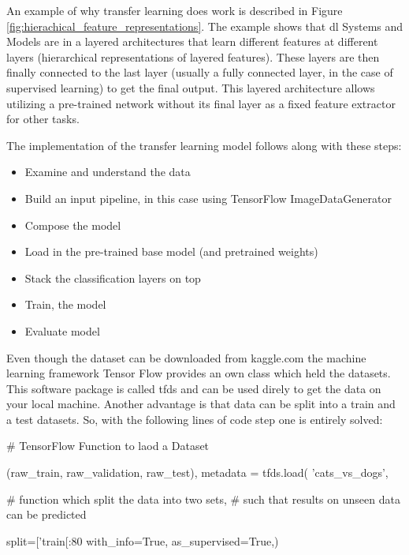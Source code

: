 An example of why transfer learning does work is described in  Figure \ref{fig:hierachical_feature_representations}. The example shows that \gls{dl} Systems and Models are in a layered architectures that learn different features at different layers (hierarchical representations of layered features). These layers are then finally connected to the last layer (usually a fully connected layer, in the case of supervised learning) to get the final output. This layered architecture allows utilizing a pre-trained network without its final layer as a fixed feature extractor for other tasks.

The implementation of the transfer learning model follows along with these steps:
\begin{itemize}
	\item Examine and understand the data
	\item Build an input pipeline, in this case using TensorFlow ImageDataGenerator
	\item Compose the model
	\item Load in the pre-trained base model (and pretrained weights)
	\item Stack the classification layers on top
	\item Train, the model
	\item Evaluate model
\end{itemize}

Even though the dataset can be downloaded from kaggle.com the machine learning framework Tensor Flow provides an own class which held the datasets. This software package is called tfds and can be used direly to get the data on your local machine. Another advantage is that data can be split into a train and a test datasets. So, with the following lines of code step one is entirely solved:\\

\begin{python}[label={lst:load}, caption= The "Dogs vs Cats" dataset gets loaded from the TensorFlow libbrary. The data will be spllited directliy into a test and train set.]

# TensorFlow Function to laod a Dataset 

(raw_train, raw_validation, raw_test), metadata = tfds.load(
'cats_vs_dogs',

# function which split the data into two sets,
# such that results on unseen data can be predicted

split=['train[:80%
with_info=True,
as_supervised=True,)
\end{python}

